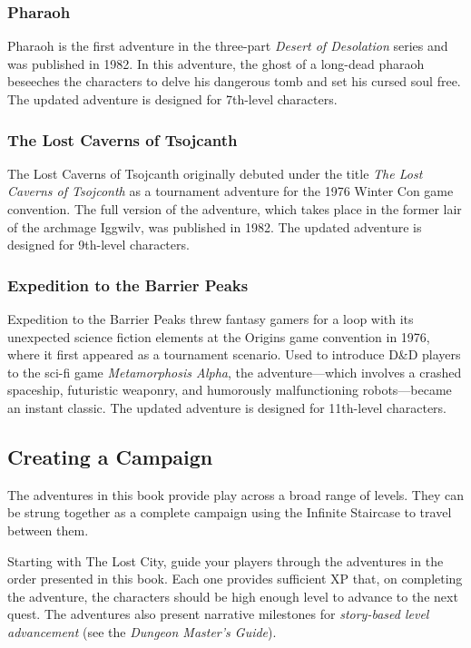 \documentclass[10pt,a4paper,twoside,bg=print,twocolumn,openany,nodeprecatedcode]{dndbook}
\begin{document}
\subsubsection{Pharaoh}
Pharaoh is the first adventure in the three-part \textit{Desert of Desolation} series and was published in 1982. In this adventure, the ghost of a long-dead pharaoh beseeches the characters to delve his dangerous tomb and set his cursed soul free. The updated adventure is designed for 7th-level characters.

\subsubsection{The Lost Caverns of Tsojcanth}
The Lost Caverns of Tsojcanth originally debuted under the title \textit{The Lost Caverns of Tsojconth} as a tournament adventure for the 1976 Winter Con game convention. The full version of the adventure, which takes place in the former lair of the archmage Iggwilv, was published in 1982. The updated adventure is designed for 9th-level characters.

\subsubsection{Expedition to the Barrier Peaks}
Expedition to the Barrier Peaks threw fantasy gamers for a loop with its unexpected science fiction elements at the Origins game convention in 1976, where it first appeared as a tournament scenario. Used to introduce D\&D players to the sci-fi game \textit{Metamorphosis Alpha}, the adventure—which involves a crashed spaceship, futuristic weaponry, and humorously malfunctioning robots—became an instant classic. The updated adventure is designed for 11th-level characters.

\subsection{Creating a Campaign}
The adventures in this book provide play across a broad range of levels. They can be strung together as a complete campaign using the Infinite Staircase to travel between them.

Starting with The Lost City, guide your players through the adventures in the order presented in this book. Each one provides sufficient XP that, on completing the adventure, the characters should be high enough level to advance to the next quest. The adventures also present narrative milestones for \textit{story-based level advancement} (see the \textit{Dungeon Master's Guide}).
\end{document}
